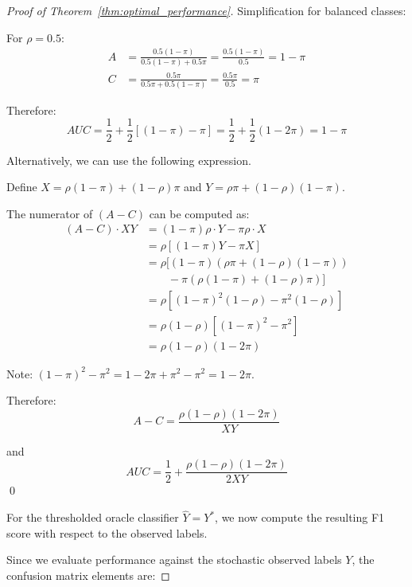 \documentclass{article} %
\theoremstyle{plain}
\theoremstyle{definition}
\theoremstyle{remark}
\begin{document}
\begin{proof}[Proof of Theorem~\ref{thm:optimal_performance}]
Simplification for balanced classes:

For $\rho = 0.5$:
\begin{align}
A &= \frac{0.5(1-\pi)}{0.5(1-\pi) + 0.5\pi} = \frac{0.5(1-\pi)}{0.5} = 1-\pi \\
C &= \frac{0.5\pi}{0.5\pi + 0.5(1-\pi)} = \frac{0.5\pi}{0.5} = \pi
\end{align}

Therefore:
\begin{equation}
AUC = \frac{1}{2} + \frac{1}{2}[(1-\pi) - \pi] = \frac{1}{2} + \frac{1}{2}(1-2\pi) = 1 - \pi
\end{equation}

Alternatively, we can use the following expression.

Define $X = \rho(1-\pi) + (1-\rho)\pi$ and $Y = \rho \pi + (1-\rho)(1-\pi)$.

The numerator of $(A - C)$ can be computed as:
\begin{align}
(A - C) \cdot XY &= (1-\pi)\rho \cdot Y - \pi\rho \cdot X \\
&= \rho[(1-\pi)Y - \pi X] \\
&= \rho[(1-\pi)(\rho \pi + (1-\rho)(1-\pi)) \\
&\qquad - \pi(\rho(1-\pi) + (1-\rho)\pi)] \\
&= \rho[(1-\pi)^2(1-\rho) - \pi^2(1-\rho)] \\
&= \rho(1-\rho)[(1-\pi)^2 - \pi^2] \\
&= \rho(1-\rho)(1-2\pi)
\end{align}

Note: $(1-\pi)^2 - \pi^2 = 1 - 2\pi + \pi^2 - \pi^2 = 1 - 2\pi$.

Therefore:
\begin{equation}
A - C = \frac{\rho(1-\rho)(1-2\pi)}{XY}
\end{equation}

and
\begin{equation}
AUC = \frac{1}{2} + \frac{\rho(1-\rho)(1-2\pi)}{2XY}
\end{equation}
\qed

For the thresholded oracle classifier $\widehat{Y}=Y^{*}$, we now compute the resulting F1 score with respect to the observed labels.

Since we evaluate performance against the stochastic observed labels $Y$, the confusion matrix elements are:


\end{proof}
\end{document}
